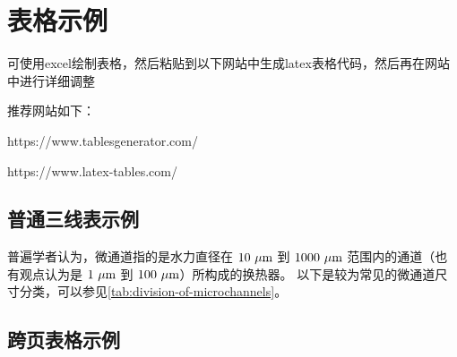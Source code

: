 
\chapter{表格示例}\label{ch:3}
可使用excel绘制表格，然后粘贴到以下网站中生成latex表格代码，然后再在网站中进行详细调整

推荐网站如下：

https://www.tablesgenerator.com/

https://www.latex-tables.com/


\section{普通三线表示例}
普遍学者认为，微通道指的是水力直径在 $10\ \rm{\mu m}$ 到 $1000\ \rm{\mu m}$ 范围内的通道（也有观点认为是 $1\ \rm{\mu m}$ 到 $100\ \rm{\mu m}$）所构成的换热器。
以下是较为常见的微通道尺寸分类，可以参见\cref{tab:division-of-microchannels}。
\begin{table}[htbp]
    \caption[微通道的划分]{微通道的划分\cite{LuSiHong_2021}}
    \label{tab:division-of-microchannels}
\end{table}



\section{跨页表格示例}

